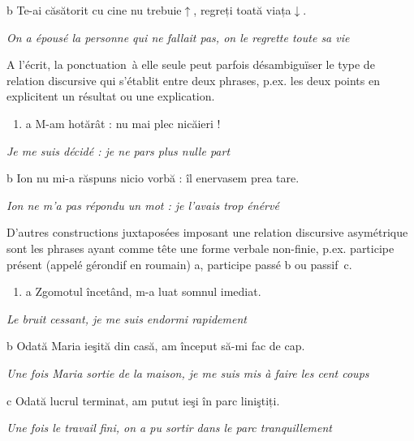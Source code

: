   b  Te-ai căsătorit cu cine nu trebuie$\uparrow $, regreți toată viața$\downarrow $.

    \textit{On a épousé la personne qui ne fallait pas, on le regrette toute sa vie}

A l'écrit, la ponctuation~à elle seule peut parfois désambiguïser le type de relation discursive qui s'établit entre deux phrases, p.ex. les deux points en  explicitent un résultat ou une explication. 


\begin{enumerate}
\item \label{bkm:Ref273714782}a  M-am hotărât : nu mai plec nicăieri !


\end{enumerate}
{\itshape
Je me suis décidé : je ne pars plus nulle part } 

  b  Ion nu mi-a răspuns nicio vorbă : îl enervasem prea tare.

    \textit{Ion ne m'a pas répondu un mot : je l'avais trop énérvé}

D'autres constructions juxtaposées imposant une relation discursive asymétrique sont les phrases ayant comme tête une forme verbale non-finie, p.ex. participe présent (appelé gérondif en roumain) a, participe passé b ou passif~c. 


\begin{enumerate}
\item \label{bkm:Ref273714325}a  Zgomotul încetând, m-a luat somnul imediat.


\end{enumerate}
{\itshape
Le bruit cessant, je me suis endormi rapidement}

  b  Odată Maria ieşită din casă, am început să-mi fac de cap. 

{\itshape
Une fois Maria sortie de la maison, je me suis mis à faire les cent coups}

  c  Odată lucrul terminat, am putut ieşi în parc liniştiți. 

\textit{Une fois le travail fini, on a pu sortir dans le parc tranquillement}  

